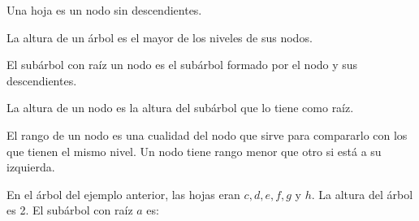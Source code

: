 \begin{ndef}[Hoja]
    Una hoja es un nodo sin descendientes.
\end{ndef}
\begin{ndef}
    La altura de un árbol es el mayor de los niveles de sus nodos.
\end{ndef}
\begin{ndef}
    El subárbol con raíz un nodo es el subárbol formado por el nodo y sus descendientes.
\end{ndef}
\begin{ndef}
    La altura de un nodo es la altura del subárbol que lo tiene como raíz.
\end{ndef}
\begin{ndef}
    El rango de un nodo es una cualidad del nodo que sirve para compararlo con los que tienen el mismo nivel. Un nodo tiene rango menor que otro si está a su izquierda.
\end{ndef}

\begin{ejemplo} En el árbol del ejemplo anterior, las hojas eran $c,d,e,f,g$ y $h$. La altura del árbol es 2. El subárbol con raíz $a$ es:
    \begin{center}
    \end{center}
\end{ejemplo}

